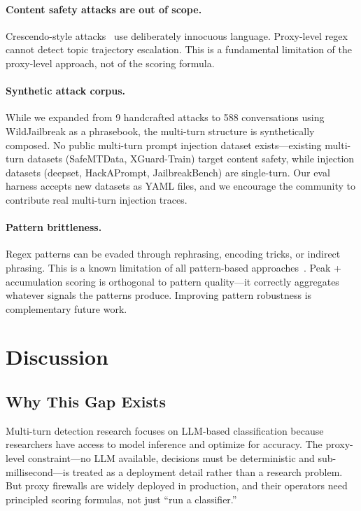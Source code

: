 \documentclass[11pt,a4paper]{article}
\begin{document}
\paragraph{Content safety attacks are out of scope.} Crescendo-style
attacks~\cite{crescendo} use deliberately innocuous language.
Proxy-level regex cannot detect topic trajectory escalation. This is a
fundamental limitation of the proxy-level approach, not of the scoring
formula.

\paragraph{Synthetic attack corpus.} While we expanded from 9
handcrafted attacks to 588 conversations using WildJailbreak as a
phrasebook, the multi-turn structure is synthetically composed. No
public multi-turn prompt injection dataset exists---existing multi-turn
datasets (SafeMTData, XGuard-Train) target content safety, while
injection datasets (deepset, HackAPrompt, JailbreakBench) are
single-turn. Our eval harness accepts new datasets as YAML files, and
we encourage the community to contribute real multi-turn injection
traces.

\paragraph{Pattern brittleness.} Regex patterns can be evaded through
rephrasing, encoding tricks, or indirect phrasing. This is a known
limitation of all pattern-based approaches~\cite{attackermovessecond}.
Peak + accumulation scoring is orthogonal to pattern quality---it
correctly aggregates whatever signals the patterns produce. Improving
pattern robustness is complementary future work.

\section{Discussion}
\label{sec:discussion}

\subsection{Why This Gap Exists}

Multi-turn detection research focuses on LLM-based classification
because researchers have access to model inference and optimize for
accuracy. The proxy-level constraint---no LLM available, decisions must
be deterministic and sub-millisecond---is treated as a deployment detail
rather than a research problem. But proxy firewalls are widely deployed
in production, and their operators need principled scoring formulas, not
just ``run a classifier.''
\end{document}
